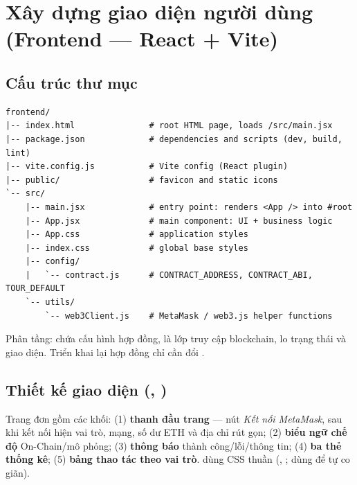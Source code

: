 \section{Xây dựng giao diện người dùng (Frontend --- React + Vite)}
\label{sec:ch3}

\subsection{Cấu trúc thư mục }

\begin{lstlisting}[style=ShellStyle, caption={Cấu trúc thư mục frontend}]
frontend/
|-- index.html               # root HTML page, loads /src/main.jsx
|-- package.json             # dependencies and scripts (dev, build, lint)
|-- vite.config.js           # Vite config (React plugin)
|-- public/                  # favicon and static icons
`-- src/
    |-- main.jsx             # entry point: renders <App /> into #root
    |-- App.jsx              # main component: UI + business logic
    |-- App.css              # application styles
    |-- index.css            # global base styles
    |-- config/
    |   `-- contract.js      # CONTRACT_ADDRESS, CONTRACT_ABI, TOUR_DEFAULT
    `-- utils/
        `-- web3Client.js    # MetaMask / web3.js helper functions
\end{lstlisting}

Phân tầng:  chứa cấu hình hợp đồng,  là lớp truy cập blockchain,
 lo trạng thái và giao diện. Triển khai lại hợp đồng chỉ cần đổi .

\subsection{Thiết kế giao diện (, )}

Trang đơn gồm các khối: (1) \textbf{thanh đầu trang} --- nút \emph{Kết nối MetaMask}, sau khi kết nối hiện vai trò, mạng, số dư ETH và địa chỉ rút gọn;
(2) \textbf{biểu ngữ chế độ} On-Chain/mô phỏng; (3) \textbf{thông báo} thành công/lỗi/thông tin; (4) \textbf{ba thẻ thống kê};
(5) \textbf{bảng thao tác theo vai trò}.  dùng CSS thuần (, ;  dùng
 để tự co giãn).

